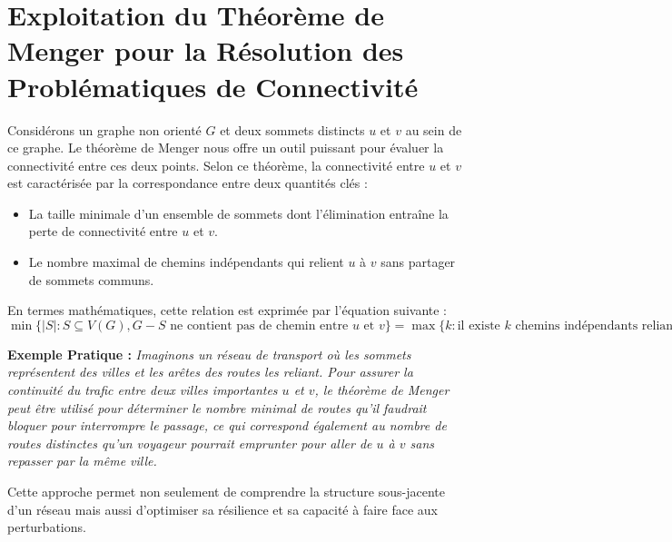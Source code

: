 \section{Exploitation du Théorème de Menger pour la Résolution des Problématiques de Connectivité}

Considérons un graphe non orienté \( G \) et deux sommets distincts \( u \) et \( v \) au sein de ce graphe. Le théorème de Menger nous offre un outil puissant pour évaluer la connectivité entre ces deux points. Selon ce théorème, la connectivité entre \( u \) et \( v \) est caractérisée par la correspondance entre deux quantités clés :

\begin{itemize}
    \item La taille minimale d'un ensemble de sommets dont l'élimination entraîne la perte de connectivité entre \( u \) et \( v \).
    \item Le nombre maximal de chemins indépendants qui relient \( u \) à \( v \) sans partager de sommets communs.
\end{itemize}

En termes mathématiques, cette relation est exprimée par l'équation suivante :
$$
\min \{ |S| : S \subseteq V(G), G - S \text{ ne contient pas de chemin entre } u \text{ et } v \} = \max \{ k : \text{il existe } k \text{ chemins indépendants reliant } u \text{ à } v \}.
$$

\textbf{Exemple Pratique :}
\textit{Imaginons un réseau de transport où les sommets représentent des villes et les arêtes des routes les reliant. Pour assurer la continuité du trafic entre deux villes importantes \( u \) et \( v \), le théorème de Menger peut être utilisé pour déterminer le nombre minimal de routes qu'il faudrait bloquer pour interrompre le passage, ce qui correspond également au nombre de routes distinctes qu'un voyageur pourrait emprunter pour aller de \( u \) à \( v \) sans repasser par la même ville.}

Cette approche permet non seulement de comprendre la structure sous-jacente d'un réseau mais aussi d'optimiser sa résilience et sa capacité à faire face aux perturbations.
